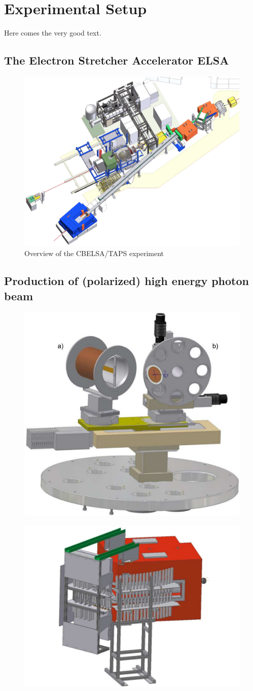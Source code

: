\chapter{Experimental Setup}
Here comes the very good text.
\section{The Electron Stretcher Accelerator ELSA}
\begin{figure}[htbp]
	\centering
	\includegraphics[width=.7\linewidth]{figs/CB-Area.jpg}
	\caption{Overview of the CBELSA/TAPS experiment \cite{cb}}
\end{figure}
\section{Production of (polarized) high energy photon beam}
\begin{figure}[htbp]
	\centering
	\includegraphics[width=.49\linewidth]{figs/goni-ganz.pdf}
	\caption{\cite{cb}}
\end{figure}
\begin{figure}[htbp]
	\centering
	\includegraphics[width=.49\linewidth]{figs/Tagger.pdf}
	\caption{\cite{cb}}
\end{figure}

